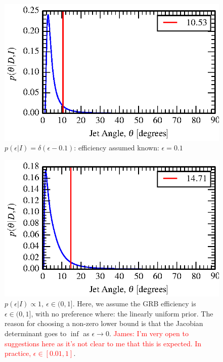 \documentclass[twocolumn,nofootinbib]{revtex4-1}
\begin{document}
\begin{figure}[h!]
\includegraphics{iLIGO/jet_angle_posterior_s6UL_TEST_deltaEffPrior-0.1.eps}
\caption{$p(\epsilon|I)=\delta(\epsilon-0.1)$: efficiency assumed known:
$\epsilon=0.1$}
\end{figure}

\begin{figure}[h!]
\includegraphics{iLIGO/jet_angle_posterior_s6UL_TEST_flatEffPrior-0.01-1.eps}
\caption{$p(\epsilon|I) \propto 1,~\epsilon \in (0,1]$. 
Here, we assume the GRB efficiency is $\epsilon \in (0,1]$, with no
preference where: the linearly uniform prior.  The reason for choosing a
non-zero lower bound is that the Jacobian determinant goes to $\inf$ as
$\epsilon \rightarrow 0$.  \textcolor{red}{James: I'm very open to suggestions
here as it's not clear to me that this is expected.  In practice, $\epsilon \in
[0.01,1]$}.}
\end{figure}
\end{document}
